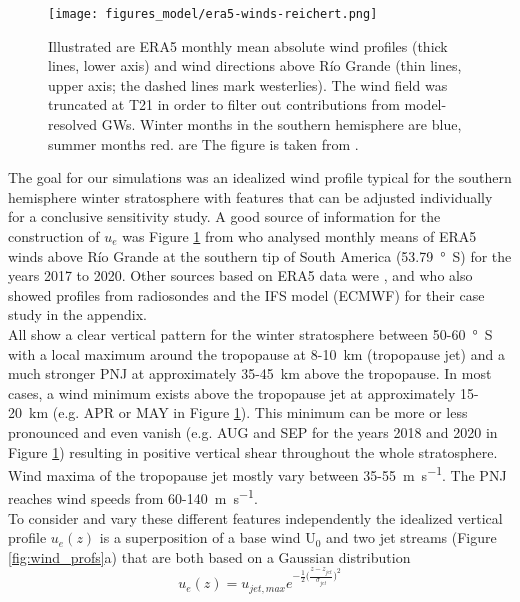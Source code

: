 \begin{figure}[tbp]
    \centering
    \texttt{[image: figures\_model/era5-winds-reichert.png]}
    \caption{Illustrated are ERA5 monthly mean absolute wind profiles (thick lines, lower axis) and wind directions above Río Grande (thin lines, upper axis; the dashed lines mark westerlies). The wind field was truncated at T21 in order to filter out contributions from model-resolved GWs. Winter months in the southern hemisphere are blue, summer months red. are The figure is taken from \textcite[]{reichert_robert_characterization_2022}.}
    \label{fig:era5-winds-reichert}
\end{figure} 
The goal for our simulations was an idealized wind profile typical for the southern hemisphere winter stratosphere with features that can be adjusted individually for a conclusive sensitivity study. A good source of information for the construction of $u_e$ was Figure \ref{fig:era5-winds-reichert} from \textcite[]{reichert_robert_characterization_2022} who analysed monthly means of ERA5 winds above Río Grande at the southern tip of South America (\SI{53.79}{\degree S}) for the years 2017 to 2020. Other sources based on ERA5 data were \textcite[]{rapp_southtrac-gw_2021}, \textcite[]{mixa_nonlinear_2021} and \textcite[]{dornbrack_stratospheric_2022} who also showed profiles from radiosondes and the IFS model (ECMWF) for their case study in the appendix. \\
All show a clear vertical pattern for the winter stratosphere between 50-\SI{60}{\degree S} with a local maximum around the tropopause at 8-\SI{10}{\kilo\meter} (tropopause jet) and a much stronger PNJ at approximately 35-\SI{45}{\kilo\meter} above the tropopause. In most cases, a wind minimum exists above the tropopause jet at approximately 15-\SI{20}{\kilo\meter} (e.g. APR or MAY in Figure \ref{fig:era5-winds-reichert}). This minimum can be more or less pronounced and even vanish (e.g. AUG and SEP for the years 2018 and 2020 in Figure \ref{fig:era5-winds-reichert}) resulting in positive vertical shear throughout the whole stratosphere. Wind maxima of the tropopause jet mostly vary between 35-\SI{55}{\meter\per\second}. The PNJ reaches wind speeds from 60-\SI{140}{\meter\per\second}. \\
To consider and vary these different features independently the idealized vertical profile $u_e(z)$ is a superposition of a base wind U$_0$ and two jet streams (Figure \ref{fig:wind_profs}a) that are both based on a Gaussian distribution
\begin{equation}
    u_e(z) = u_{jet,max} e^{-\frac{1}{2} \bigl(\frac{z-z_{jet}}{\sigma_{jet}}\bigr)^2}
    \label{equ:wind-distribution}
\end{equation}
